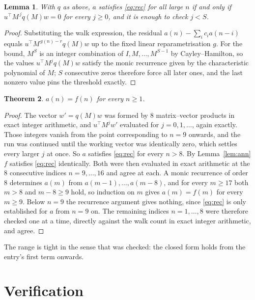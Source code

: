 \documentclass[11pt,a4paper]{article}
\theoremstyle{plain}
\newtheorem{theorem}{Theorem}
\newtheorem{lemma}[theorem]{Lemma}
\theoremstyle{definition}
\begin{document}
\begin{lemma}\label{lem:crit}
With $q$ as above, $a$ satisfies \eqref{eq:rec} for all large $n$ if and only if
$u^{\!\top}M^{\,j}q(M)w=0$ for every $j\ge0$, and it is enough to check $j<S$.
\end{lemma}

\begin{proof}
Substituting the walk expression, the residual $a(n)-\sum_ic_ia(n-i)$ equals
$u^{\!\top}M^{\,g(n)-r}q(M)w$ up to the fixed linear reparametrisation $g$. For the bound,
$M^{S}$ is an integer combination of $I,M,\dots,M^{S-1}$ by Cayley--Hamilton, so the values
$u^{\!\top}M^{j}q(M)w$ satisfy the monic recurrence given by the characteristic polynomial of
$M$; $S$ consecutive zeros therefore force all later ones, and the last nonzero value pins the
threshold exactly.
\end{proof}

\begin{theorem}
$a(n)=f(n)$ for every $n\ge1$.
\end{theorem}

\begin{proof}
The vector $w'=q(M)w$ was formed by $8$ matrix--vector products in exact integer
arithmetic, and $u^{\!\top}M^{j}w'$ evaluated for $j=0,1,\dots$, again exactly. Those integers
vanish from the point corresponding to $n=9$ onwards, and the run was continued until the
working vector was identically zero, which settles every larger $j$ at once. So $a$ satisfies
\eqref{eq:rec} for every $n>8$. By Lemma~\ref{lem:ann} $f$ satisfies \eqref{eq:rec}
identically. Both were then evaluated in exact arithmetic at the $8$ consecutive indices
$n=9,\dots,16$ and agree at each. A monic recurrence of order $8$
determines $a(m)$ from $a(m-1),\dots,a(m-8)$, and for every $m\ge17$ both
$m>8$ and $m-8\ge9$ hold, so induction on $m$ gives $a(m)=f(m)$ for every
$m\ge9$.
Below $n=9$ the recurrence argument gives nothing, since \eqref{eq:rec} is only
established for $a$ from $n=9$ on. The remaining indices $n=1,\dots,8$ were
therefore checked one at a time, directly against the walk count in exact integer arithmetic,
and agree.
\end{proof}

The range is tight in the sense that was checked: the closed form holds from the entry's first term onwards.

\section{Verification}
\end{document}
